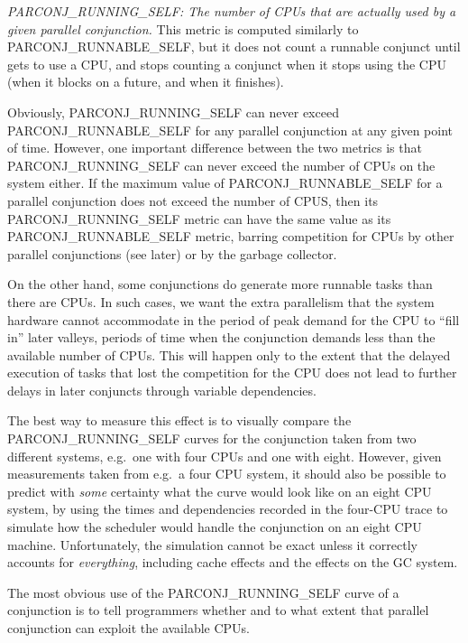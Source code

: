 \emph{PARCONJ\_RUNNING\_SELF:
The number of CPUs that are actually used by a given parallel conjunction.}
This metric is computed similarly to PARCONJ\_RUNNABLE\_SELF,
but it does not count a runnable conjunct until gets to use a CPU,
and stops counting a conjunct when it stops using the CPU
(when it blocks on a future, and when it finishes).

Obviously, PARCONJ\_RUNNING\_SELF can never exceed PARCONJ\_RUNNABLE\_SELF
for any parallel conjunction at any given point of time.
However, one important difference between the two metrics
is that PARCONJ\_RUNNING\_SELF can never exceed
the number of CPUs on the system either.
If the maximum value of PARCONJ\_RUNNABLE\_SELF for a parallel conjunction
does not exceed the number of CPUS,
then its PARCONJ\_RUNNING\_SELF metric
can have the same value as its PARCONJ\_RUNNABLE\_SELF metric,
barring competition for CPUs by other parallel conjunctions (see later)
or by the garbage collector.

On the other hand, some conjunctions
do generate more runnable tasks than there are CPUs.
In such cases, we want the extra parallelism
that the system hardware cannot accommodate
in the period of peak demand for the CPU
to ``fill in'' later valleys,
periods of time when the conjunction demands
less than the available number of CPUs.
This will happen only to the extent that
the delayed execution of tasks that lost the competition for the CPU
does not lead to further delays in later conjuncts
through variable dependencies.

The best way to measure this effect
is to visually compare the PARCONJ\_RUNNING\_SELF curves for the conjunction
taken from two different systems,
e.g.\ one with four CPUs and one with eight.
However, given measurements taken from e.g.\ a four CPU system,
it should also be possible to predict with \emph{some} certainty
what the curve would look like on an eight CPU system,
by using the times and dependencies recorded in the four-CPU trace
to simulate how the scheduler would handle the conjunction
on an eight CPU machine.
Unfortunately, the simulation cannot be exact
unless it correctly accounts for \emph{everything},
including cache effects and the effects on the GC system.

The most obvious use of the PARCONJ\_RUNNING\_SELF curve of a conjunction
is to tell programmers whether and to what extent
that parallel conjunction can exploit the available CPUs.

